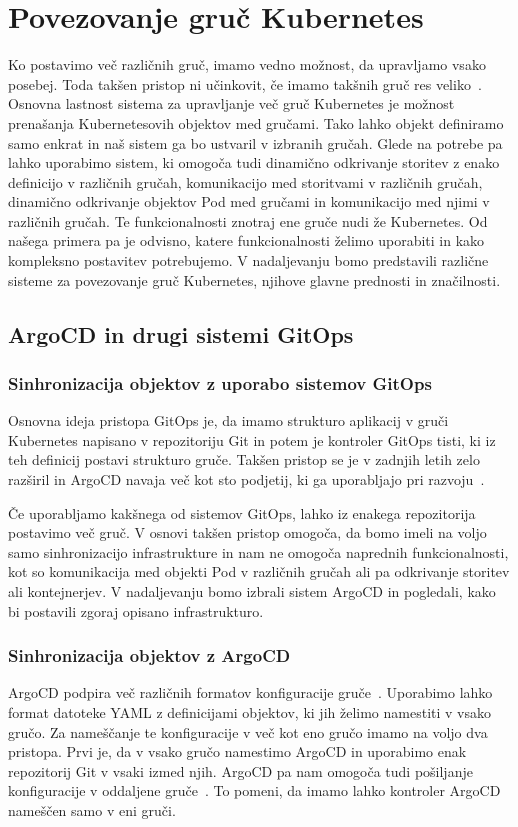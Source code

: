 \documentclass[a4paper, 12pt]{book}
\begin{document}
\chapter{Povezovanje gruč Kubernetes}
Ko postavimo več različnih gruč, imamo vedno možnost, da upravljamo vsako posebej.
Toda takšen pristop ni učinkovit, če imamo takšnih gruč res veliko~\cite{difference-multi-cluster}.
Osnovna lastnost sistema za upravljanje več gruč Kubernetes je možnost prenašanja Kubernetesovih objektov med gručami.
Tako lahko objekt definiramo samo enkrat in naš sistem ga bo ustvaril v izbranih gručah.
Glede na potrebe pa lahko uporabimo sistem, ki omogoča tudi dinamično odkrivanje storitev z enako definicijo v različnih gručah, komunikacijo med storitvami v različnih gručah, dinamično odkrivanje objektov Pod med gručami in komunikacijo med njimi v različnih gručah.
Te funkcionalnosti znotraj ene gruče nudi že Kubernetes.
Od našega primera pa je odvisno, katere funkcionalnosti želimo uporabiti in kako kompleksno postavitev potrebujemo.
V nadaljevanju bomo predstavili različne sisteme za povezovanje gruč Kubernetes, njihove glavne prednosti in značilnosti.
\section{ArgoCD in drugi sistemi GitOps}
\subsection{Sinhronizacija objektov z uporabo sistemov GitOps}
Osnovna ideja pristopa GitOps je, da imamo strukturo aplikacij v gruči Kubernetes napisano v repozitoriju Git in potem je kontroler GitOps tisti, ki iz teh definicij postavi strukturo gruče.
Takšen pristop se je v zadnjih letih zelo razširil in ArgoCD navaja več kot sto podjetij, ki ga uporabljajo pri razvoju~\cite{argocd-user-list}.

Če uporabljamo kakšnega od sistemov GitOps, lahko iz enakega repozitorija postavimo več gruč.
V osnovi takšen pristop omogoča, da bomo imeli na voljo samo sinhronizacijo infrastrukture in nam ne omogoča naprednih funkcionalnosti, kot so komunikacija med objekti Pod v različnih gručah ali pa odkrivanje storitev ali kontejnerjev.
V nadaljevanju bomo izbrali sistem ArgoCD in pogledali, kako bi postavili zgoraj opisano infrastrukturo.
\subsection{Sinhronizacija objektov z ArgoCD}
ArgoCD podpira več različnih formatov konfiguracije gruče~\cite{argocd-docs}.
Uporabimo lahko format datoteke YAML z definicijami objektov, ki jih želimo namestiti v vsako gručo.
Za nameščanje te konfiguracije v več kot eno gručo imamo na voljo dva pristopa.
Prvi je, da v vsako gručo namestimo ArgoCD in uporabimo enak repozitorij Git v vsaki izmed njih.
ArgoCD pa nam omogoča tudi pošiljanje konfiguracije v oddaljene gruče~\cite{declarative-setup}.
To pomeni, da imamo lahko kontroler ArgoCD nameščen samo v eni gruči.
\end{document}
